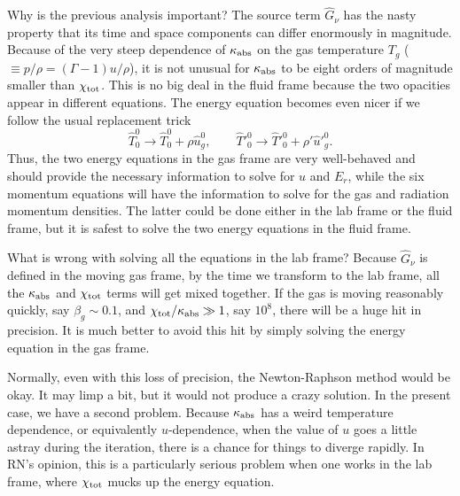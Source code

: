 \documentclass[12pt,preprint]{aastex}
\begin{document}
Why is the previous analysis important? The source term
$\widehat{G}_\nu$ has the nasty property that its time and space
components can differ enormously in magnitude. Because of the very
steep dependence of $\kappa_{\rm abs}$ on the gas temperature $T_g$
($\equiv p/\rho = (\Gamma-1)u/\rho$), it is not unusual for
$\kappa_{\rm abs}$ to be eight orders of magnitude smaller than
$\chi_{\rm tot}$. This is no big deal in the fluid frame because the
two opacities appear in different equations. The energy equation
becomes even nicer if we follow the usual replacement trick
\begin{equation}
\widehat{T}^0_0 \to \widehat{T}^0_0+\rho \widehat{u}^0_g, \qquad
\widehat{T}'^0_0 \to \widehat{T}'^0_0+\rho' \widehat{u}'^0_g.
\end{equation}
Thus, the two energy equations in the gas frame are very well-behaved
and should provide the necessary information to solve for $u$ and
$E_r$, while the six momentum equations will have the information to
solve for the gas and radiation momentum densities. The latter could
be done either in the lab frame or the fluid frame, but it is safest
to solve the two energy equations in the fluid frame.

What is wrong with solving all the equations in the lab frame? Because
$\widehat{G}_\nu$ is defined in the moving gas frame, by the time we
transform to the lab frame, all the $\kappa_{\rm abs}$ and $\chi_{\rm
  tot}$ terms will get mixed together. If the gas is moving reasonably
quickly, say $\beta_g \sim 0.1$, and $\chi_{\rm tot}/\kappa_{\rm abs}
\gg 1$, say $10^8$, there will be a huge hit in precision. It is much
better to avoid this hit by simply solving the energy equation in the
gas frame.

Normally, even with this loss of precision, the Newton-Raphson method
would be okay. It may limp a bit, but it would not produce a crazy
solution. In the present case, we have a second problem. Because
$\kappa_{\rm abs}$ has a weird temperature dependence, or equivalently
$u$-dependence, when the value of $u$ goes a little astray during the
iteration, there is a chance for things to diverge rapidly. In RN's
opinion, this is a particularly serious problem when one works in the
lab frame, where $\chi_{\rm tot}$ mucks up the energy equation.
\end{document}
